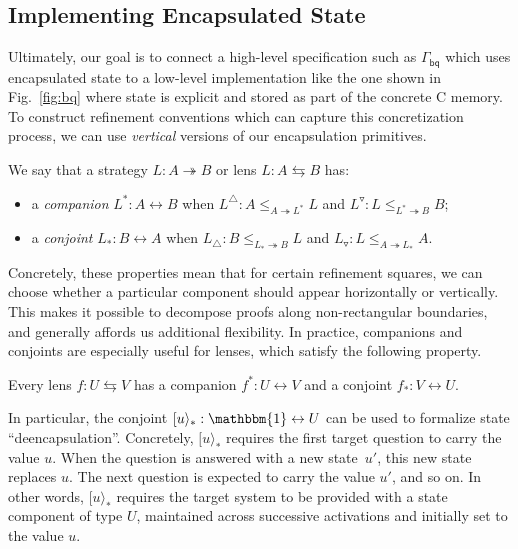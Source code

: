 \documentclass[acmsmall,screen,review,anonymous,nonacm]{acmart}
\newcommand{\kw}[1]{\ensuremath{ \mathsf{#1} }}
\newcommand{\lensarrow}{\leftrightarrows}
\begin{document}

\subsection{Implementing Encapsulated State} %

Ultimately, our goal
is to connect a high-level specification such as $\Gamma_\kw{bq}$
which uses encapsulated state
to a low-level implementation like the one shown in Fig.~\ref{fig:bq}
where state is explicit and stored as part of the concrete C memory.
To construct refinement conventions
which can capture this concretization process,
we can use \emph{vertical} versions of our encapsulation primitives.

\begin{definition} %
We say that a strategy $L : A \twoheadrightarrow B$
or lens $L : A \leftrightarrows B$
has:
\begin{itemize}
  \item a \emph{companion} $L^* : A \leftrightarrow B$ when
    $L^\triangle : A \le_{A \twoheadrightarrow L^*} L$
    and
    $L^\triangledown : L \le_{L^* \twoheadrightarrow B} B$;
  \item a \emph{conjoint} $L_* : B \leftrightarrow A$ when
    $L_\triangle : B \le_{L_* \twoheadrightarrow B} L$
    and
    $L_\triangledown : L \le_{A \twoheadrightarrow L_*} A$.
\end{itemize}
\end{definition}

Concretely,
these properties mean that for certain refinement squares,
we can choose
whether a particular component
should appear horizontally or vertically.
This makes it possible to decompose proofs
along non-rectangular boundaries,
and generally affords us additional flexibility.
%
In practice,
companions and conjoints
are especially useful for lenses,
which satisfy the following property.

\begin{theorem}
Every lens $f : U \lensarrow V$
has a companion $f^* : U \leftrightarrow V$
and a conjoint $f_* : V \leftrightarrow U$.
\end{theorem}

In particular,
the conjoint
$[u\rangle_* : \mathbbm{1} \leftrightarrow U$
can be used to formalize state ``deencapsulation''.
Concretely, $[u\rangle_*$ requires the first target question
to carry the value $u$.
When the question is answered with a new state~$u'$,
this new state replaces $u$.
The next question is
expected to carry the value $u'$,
and so on.
In other words,
$[u\rangle_*$
requires the target system to be provided with a state component of type $U$,
maintained across successive activations and
initially set to the value $u$.
\end{document}
